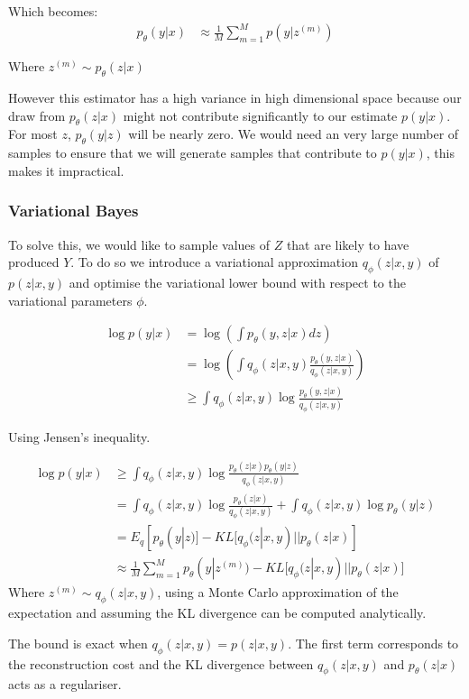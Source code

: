 \documentclass[11pt,oneside,openright]{report}
\begin{document}
Which becomes:
\begin{align}
 p_\theta(y|x) &\approx \frac{1}{M} \sum^M_{m=1} p(y | z^{(m)}) 
\end{align}

Where $ z^{(m)} \sim p_\theta(z|x) $

However this estimator has a high variance in high dimensional space because our draw from $p_\theta(z | x)$ might not contribute significantly to our estimate $p(y |x)$. For most $z$, $p_\theta(y|z)$ will be nearly zero. We would need an very large number of samples to ensure that we will generate samples that contribute to $p(y|x)$, this makes it impractical.

\subsubsection{Variational Bayes}

To solve this, we would like to sample values of $Z$ that are likely to have produced $Y$. To do so we introduce a variational approximation $q_\phi(z|x, y)$ of $p(z|x, y)$ and optimise the variational lower bound with respect to the variational parameters $\phi$.
 
\begin{align}
 \log p(y|x) &= \log(\int p_\theta(y, z|x) dz) \\
 & =  \log(\int q_\phi(z|x, y) \frac{p_\theta(y, z|x)}{q_\phi(z|x, y)}) \\
 & \geq \int q_\phi(z|x, y) \log \frac{p_\theta(y, z|x)}{q_\phi(z|x, y)}
\end{align}

Using Jensen's inequality.

\begin{align}
 \log p(y|x) & \geq \int q_\phi(z|x, y) \log \frac{p_\theta(z|x) p_\theta(y| z)}{q_\phi(z|x, y)} \\
  &= \int q_\phi(z|x, y) \log \frac{p_\theta(z|x)}{q_\phi(z|x, y)}  + \int q_\phi(z|x, y) \log p_\theta(y|z) \\
  &= E_q[p_\theta(y|z)] - KL\big[q_\phi(z|x, y) || p_\theta(z|x)]\\
  &\approx  \frac{1}{M} \sum^M_{m=1} p_\theta(y | z^{(m)}) - KL\big[q_\phi(z|x, y) || p_\theta(z|x)\big]
\end{align}
Where $ z^{(m)} \sim q_\phi(z|x, y)$, using a Monte Carlo approximation of the expectation and assuming the KL divergence can be computed analytically.

The bound is exact when $q_\phi(z| x, y) = p(z|x, y)$. The first term corresponds to the reconstruction cost and the KL divergence between $q_\phi(z|x, y)$ and $p_\theta(z|x)$ acts as a regulariser. 
\end{document}
